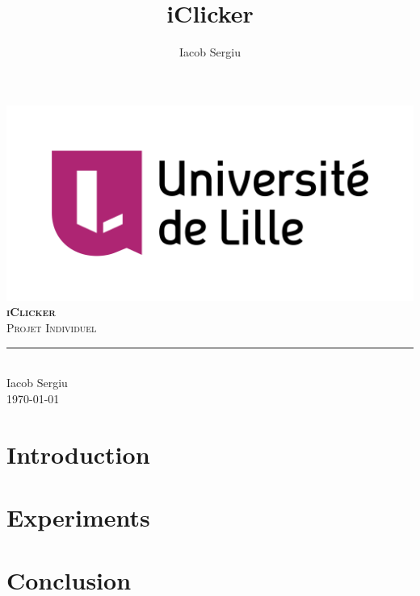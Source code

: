 \documentclass[11pt,titlepage]{report}
\author{Iacob Sergiu}
\title{iClicker}
\begin{document}
\begin{titlepage}
	\centering
    \includegraphics[width=0.75\linewidth]{universite_de_lille.png}\\[0.25cm] 	%
    \vspace{\fill}
    \textbf{\textsc{\fontsize{50}{50}\selectfont iClicker}}\\ \vspace{\fill}		
	\textsc{\LARGE Projet Individuel}\\[0.4cm]
	\rule{\linewidth}{0.2 mm} \\[0.5 cm]
    Iacob Sergiu \\[2cm]
	\today
\end{titlepage}
\restoregeometry

\tableofcontents

\chapter{Introduction}


\chapter{Experiments}


\chapter{Conclusion}


\clearpage
\pagestyle{numberonly}

\printbibliography
\end{document}
